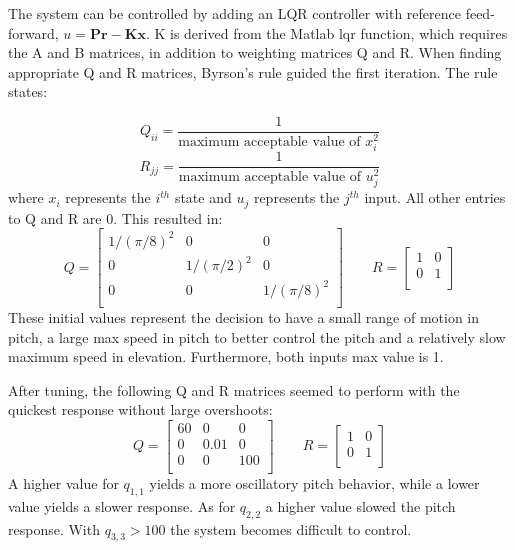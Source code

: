 The system can be controlled by adding an LQR controller with reference
feed-forward, $u = \bm{Pr}-\bm{Kx}$. K is derived from the Matlab lqr
function, which requires the A and B matrices, in addition to
weighting matrices Q and R. When finding appropriate Q and R matrices,
Byrson's rule guided the first iteration. The rule states:

\begin{equation}
  Q_{ii} = \frac{1}{\text{maximum acceptable value of }x_i^2}
\end{equation}
\begin{equation}
  R_{jj} = \frac{1}{\text{maximum acceptable value of }u_j^2}
\end{equation}
where $x_i$ represents the $i^{th}$ state and $u_j$ represents the
$j^{th}$ input. All other entries to Q and R are 0. This resulted
in: \begin{equation}
  Q =
  \begin{bmatrix}
    1/(\pi/8)^2 & 0          & 0 \\
    0 &          1/(\pi/2)^2 & 0 \\
    0 &          0          & 1/(\pi/8)^2 \\
  \end{bmatrix}
  \qquad
  R =
  \begin{bmatrix}
    1 & 0 \\
    0 & 1 \\
  \end{bmatrix}
\end{equation}
These initial values represent the decision to have a small range of motion in
pitch, a large max speed in pitch to better control the pitch and a
relatively slow maximum speed in elevation. Furthermore, both inputs
max value is 1.

After tuning, the following Q and R matrices seemed to perform with
the quickest response without large overshoots:
\begin{equation}
  Q =
  \begin{bmatrix}
    60 & 0   & 0 \\
    0  & 0.01 & 0 \\
    0  & 0   & 100 \\
  \end{bmatrix}
  \qquad
  R =
  \begin{bmatrix}
    1 & 0 \\
    0 & 1 \\
  \end{bmatrix}
\end{equation}
A higher value for $q_{1,1}$ yields a more oscillatory pitch behavior,
while a lower value yields a slower response. As for $q_{2,2}$ a
higher value slowed the pitch response. With $q_{3,3} > 100$ the
system becomes difficult to control.

